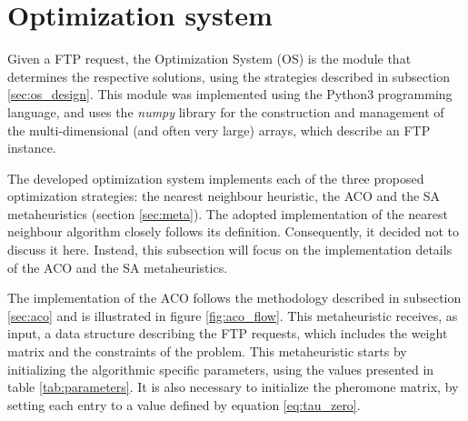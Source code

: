 \section{Optimization system}
\label{sec:os_implementation}

Given a FTP request, the Optimization System (OS) is the module that determines the respective solutions, using the strategies described in subsection \ref{sec:os_design}. This module was implemented using the Python3 programming language, and uses the \textit{numpy} library \cite{numpy} for the construction and management of the multi-dimensional (and often very large) arrays, which describe an FTP instance. 

The developed optimization system implements each of the three proposed optimization strategies: the nearest neighbour heuristic, the ACO and the SA metaheuristics (section \ref{sec:meta}). The adopted implementation of the nearest neighbour algorithm closely follows its definition. Consequently, it decided not to discuss it here. Instead, this subsection will focus on the implementation details of the ACO and the SA metaheuristics.

The implementation of the ACO follows the methodology described in subsection \ref{sec:aco} and is illustrated in figure \ref{fig:aco_flow}. This metaheuristic receives, as input, a data structure describing the FTP requests, which includes the weight matrix  and the constraints of the problem. This metaheuristic starts by initializing the algorithmic specific parameters, using the values presented in table \ref{tab:parameters}. 
It is also necessary to initialize the pheromone matrix, by setting each entry to a value defined by equation \ref{eq:tau_zero}.

